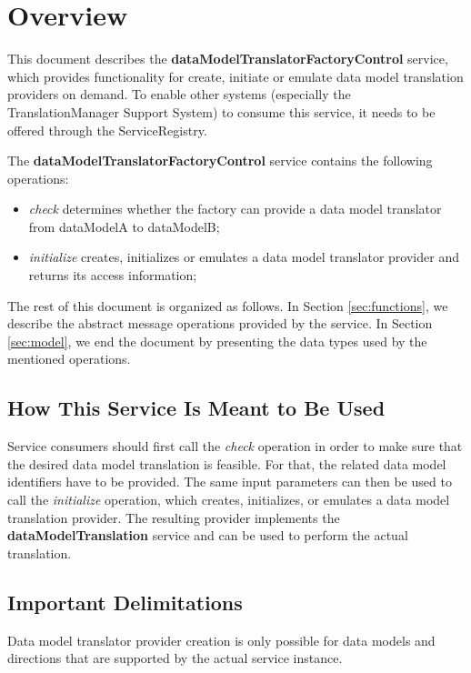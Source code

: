 \documentclass[a4paper]{arrowhead}
\begin{document}
\section{Overview}
\label{sec:overview}
This document describes the \textbf{dataModelTranslatorFactoryControl} service, which provides functionality for create, initiate or emulate data model translation providers on demand. To enable other systems (especially the TranslationManager Support System) to consume this service, it needs to be offered through the ServiceRegistry.

The \textbf{dataModelTranslatorFactoryControl} service contains the following operations:

\begin{itemize}
    \item \textit{check} determines whether the factory can provide a data model translator from dataModelA to dataModelB;
    \item \textit{initialize} creates, initializes or emulates a data model translator provider and returns its access information;
\end{itemize}

The rest of this document is organized as follows.
In Section \ref{sec:functions}, we describe the abstract message operations provided by the service.
In Section \ref{sec:model}, we end the document by presenting the data types used by the mentioned operations.

\subsection{How This Service Is Meant to Be Used}

Service consumers should first call the \textit{check} operation in order to make sure that the desired data model translation is feasible. For that, the related data model identifiers have to be provided. The same input parameters can then be used to call the \textit{initialize} operation, which creates, initializes, or emulates a data model translation provider. The resulting provider implements the \textbf{dataModelTranslation} service and can be used to perform the actual translation.

\subsection{Important Delimitations}
\label{sec:delimitations}

Data model translator provider creation is only possible for data models and directions that are supported by the actual service instance.
\end{document}
